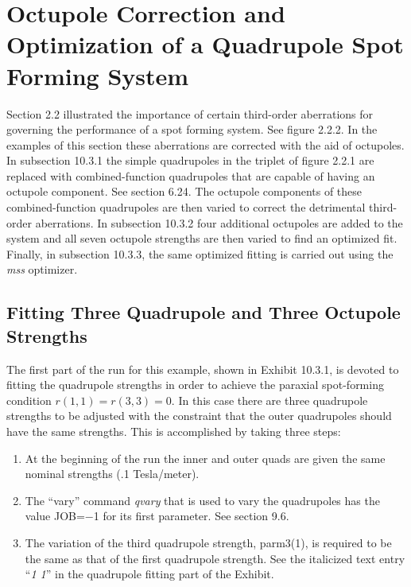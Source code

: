 \newpage
\section[Octupole Correction \& Optimization of a Quadrupole $\cdots$]{Octupole Correction and Optimization of a Quadrupole Spot Forming System}
\label{octcorrect}
Section 2.2 illustrated the importance of certain third-order aberrations
for governing the performance of a spot forming system.  See figure
2.2.2.  In the examples of this section these aberrations are corrected with
the aid of octupoles.  In subsection 10.3.1 the simple quadrupoles in
the triplet of figure 2.2.1 are replaced with combined-function quadrupoles
that are capable of having an octupole component.  See section 6.24.  The
octupole components of these combined-function quadrupoles are then
varied to correct the detrimental third-order aberrations.  In subsection
10.3.2 four additional octupoles are added to the system and all seven
octupole strengths are then varied to find an optimized fit.  Finally,
in subsection 10.3.3, the same optimized fitting is carried out using the
{\em mss} optimizer.   

\subsection{Fitting Three Quadrupole and Three Octupole Strengths}
\label{three}   
The first part of the \Mary run for this example, shown in Exhibit 10.3.1, is devoted to fitting the
quadrupole strengths in order to achieve the paraxial spot-forming
condition $r(1,1) = r(3,3) = 0$.  In this case there are three
quadrupole strengths to be adjusted with the constraint that the outer
quadrupoles should have the same strengths.  This is accomplished by
taking three steps:
\begin{enumerate}
\renewcommand{\theenumi}{roman{enumi}}
\item At the beginning of the \Mary run the inner and outer quads are
given the same nominal strengths (.1 Tesla/meter).
\item The ``vary'' command {\em qvary} that is used to vary the
quadrupoles has the value JOB=$-$1 for its first parameter.  See section 9.6.
\item The variation of the third quadrupole strength, parm3(1), is
required to be the same as that of the first quadrupole strength.  See
the italicized text entry ``{\em 1 1}'' in the quadrupole fitting part of
the Exhibit.
\end{enumerate}

